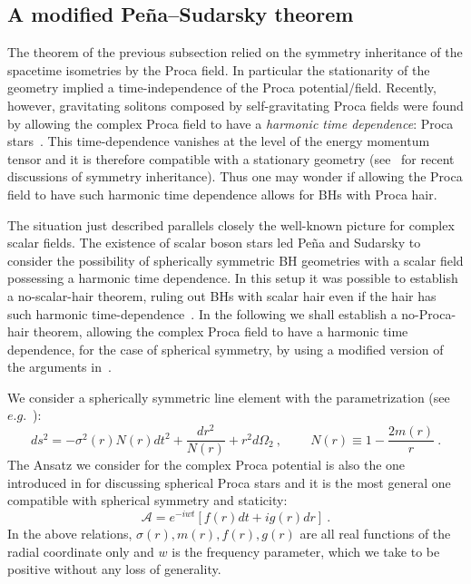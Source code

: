 \subsection{A modified Pe\~{n}a--Sudarsky theorem}
\label{sec_nohair2}
The theorem of the previous subsection relied on the symmetry inheritance of the spacetime isometries by the Proca field. In particular the stationarity of the geometry implied a time-independence of the Proca potential/field. Recently, however, gravitating solitons composed by self-gravitating Proca fields were found by allowing the complex Proca field to have a \textit{harmonic time dependence}: Proca stars~\cite{Brito:2015pxa}. This time-dependence vanishes at the level of the energy momentum tensor and it is therefore compatible with a stationary geometry (see~\cite{Smolic:2015txa} for recent discussions of symmetry inheritance). Thus one may wonder if allowing the Proca field to have such harmonic time dependence allows for BHs with Proca hair. 

The situation just described parallels closely the well-known picture for complex scalar fields. The existence of scalar boson stars led Pe\~{n}a and Sudarsky to consider the possibility of spherically symmetric BH geometries with a scalar field possessing a harmonic time dependence. In this setup it was possible to establish a no-scalar-hair theorem, ruling out BHs with scalar hair even if the hair has such harmonic time-dependence~\cite{Pena:1997cy}. In the following we shall establish a no-Proca-hair theorem, allowing the complex Proca field to have a harmonic time dependence, for the case of spherical symmetry, by using a modified version of the arguments in~\cite{Pena:1997cy}. 

We consider a spherically symmetric line element with the parametrization (see $e.g.$~\cite{Brito:2015pxa}):
%
\begin{equation}
ds^2=-\sigma^2(r)N(r)dt^2+\frac{dr^2}{N(r)}+r^2d\Omega_2 \ ,  \qquad \ N(r)\equiv 1-\frac{2m(r)}{r} \ .
\label{ansatz1}
\end{equation}
%
The Ansatz we consider for the complex Proca potential is also the one introduced in \cite{Brito:2015pxa} for discussing spherical Proca stars and it is the most general one compatible with spherical symmetry and staticity:
%
\begin{equation}
\mathcal{A}=e^{-iwt}\left[f(r)dt+ig(r)dr \right] \ .
\label{ansatz2}
\end{equation}
%
In the above relations, $\sigma(r),m(r),f(r),g(r)$ 
are all real functions of the radial coordinate only and $w$ is the frequency parameter, which we take to
be positive without any loss of generality. 

